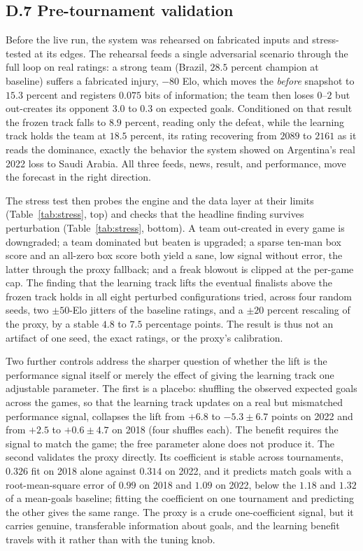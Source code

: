 \documentclass[11pt,letterpaper]{article}
\begin{document}
\subsection*{D.7 \quad Pre-tournament validation}

Before the live run, the system was rehearsed on fabricated inputs and stress-tested at its edges. The rehearsal feeds a single adversarial scenario through the full loop on real ratings: a strong team (Brazil, $28.5$ percent champion at baseline) suffers a fabricated injury, $-80$ Elo, which moves the \emph{before} snapshot to $15.3$ percent and registers $0.075$ bits of information; the team then loses $0$--$2$ but out-creates its opponent $3.0$ to $0.3$ on expected goals. Conditioned on that result the frozen track falls to $8.9$ percent, reading only the defeat, while the learning track holds the team at $18.5$ percent, its rating recovering from $2089$ to $2161$ as it reads the dominance, exactly the behavior the system showed on Argentina's real 2022 loss to Saudi Arabia. All three feeds, news, result, and performance, move the forecast in the right direction.

The stress test then probes the engine and the data layer at their limits (Table~\ref{tab:stress}, top) and checks that the headline finding survives perturbation (Table~\ref{tab:stress}, bottom). A team out-created in every game is downgraded; a team dominated but beaten is upgraded; a sparse ten-man box score and an all-zero box score both yield a sane, low signal without error, the latter through the proxy fallback; and a freak blowout is clipped at the per-game cap. The finding that the learning track lifts the eventual finalists above the frozen track holds in all eight perturbed configurations tried, across four random seeds, two $\pm 50$-Elo jitters of the baseline ratings, and a $\pm 20$ percent rescaling of the proxy, by a stable $4.8$ to $7.5$ percentage points. The result is thus not an artifact of one seed, the exact ratings, or the proxy's calibration.

Two further controls address the sharper question of whether the lift is the performance signal itself or merely the effect of giving the learning track one adjustable parameter. The first is a placebo: shuffling the observed expected goals across the games, so that the learning track updates on a real but mismatched performance signal, collapses the lift from $+6.8$ to $-5.3 \pm 6.7$ points on 2022 and from $+2.5$ to $+0.6 \pm 4.7$ on 2018 (four shuffles each). The benefit requires the signal to match the game; the free parameter alone does not produce it. The second validates the proxy directly. Its coefficient is stable across tournaments, $0.326$ fit on 2018 alone against $0.314$ on 2022, and it predicts match goals with a root-mean-square error of $0.99$ on 2018 and $1.09$ on 2022, below the $1.18$ and $1.32$ of a mean-goals baseline; fitting the coefficient on one tournament and predicting the other gives the same range. The proxy is a crude one-coefficient signal, but it carries genuine, transferable information about goals, and the learning benefit travels with it rather than with the tuning knob.
\end{document}
